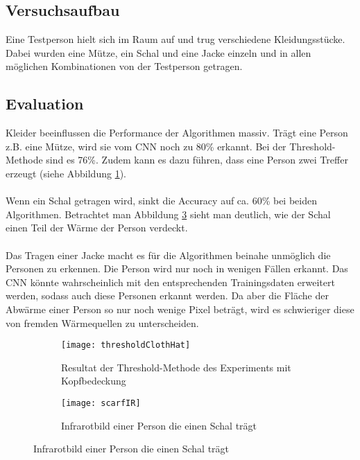 \subsection{Versuchsaufbau}

Eine Testperson hielt sich im Raum auf und trug verschiedene Kleidungsstücke. Dabei wurden eine Mütze, ein Schal und eine Jacke einzeln und in allen möglichen Kombinationen von der Testperson getragen.

\subsection{Evaluation}
Kleider beeinflussen die Performance der Algorithmen massiv. Trägt eine Person z.B. eine Mütze, wird sie vom \gls{CNN} noch zu 80\% erkannt. Bei der Threshold-Methode sind es 76\%. Zudem kann es dazu führen, dass eine Person zwei Treffer erzeugt (siehe Abbildung \ref{fig:thresholdClothHat}).\\
\\
Wenn ein Schal getragen wird, sinkt die Accuracy auf ca. 60\% bei beiden Algorithmen. Betrachtet man Abbildung \ref{fig:scarfIR} sieht man deutlich, wie der Schal einen Teil der Wärme der Person verdeckt.\\
\\
Das Tragen einer Jacke macht es für die Algorithmen beinahe unmöglich die Personen zu erkennen. Die Person wird nur noch in wenigen Fällen erkannt. Das \gls{CNN} könnte wahrscheinlich mit den entsprechenden Trainingsdaten erweitert werden, sodass auch diese Personen erkannt werden. Da aber die Fläche der Abwärme einer Person so nur noch wenige Pixel beträgt, wird es schwieriger diese von fremden Wärmequellen zu unterscheiden.\\

\begin{figure}[H]
	\begin{subfigure}{.45\linewidth}
		\centering
		\texttt{[image: thresholdClothHat]}
		\caption{Resultat der Threshold-Methode des Experiments mit Kopfbedeckung}
		\label{fig:thresholdClothHat}
	\end{subfigure}
	\begin{subfigure}{.45\linewidth}
		\centering
		\texttt{[image: scarfIR]}
		\caption{Infrarotbild einer Person die einen Schal trägt}
		\label{fig:scarfIR}
	\end{subfigure}
	
\end{figure}

